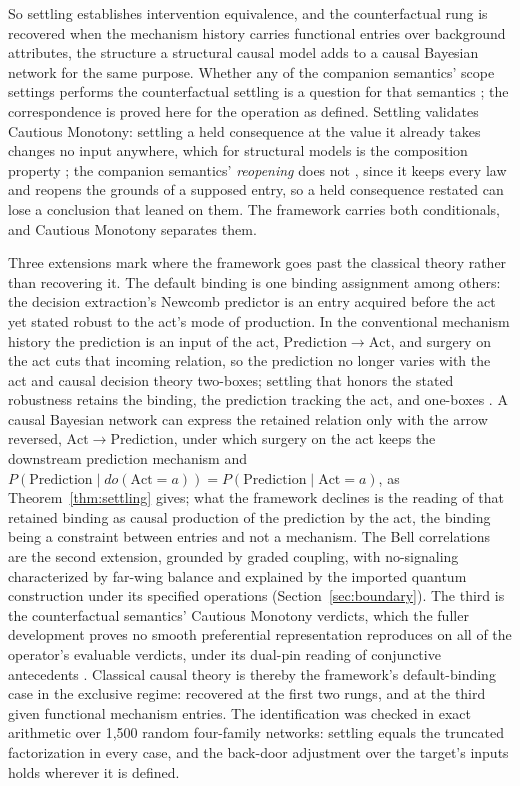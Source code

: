 \documentclass[11pt]{article}
\begin{document}
\noindent So settling establishes intervention equivalence, and the counterfactual rung is recovered when the mechanism history carries functional entries over background attributes, the structure a structural causal model adds to a causal Bayesian network for the same purpose. Whether any of the companion semantics' scope settings performs the counterfactual settling is a question for that semantics \cite{Aethus}; the correspondence is proved here for the operation as defined. Settling validates Cautious Monotony: settling a held consequence at the value it already takes changes no input anywhere, which for structural models is the composition property \cite{galles1998axiomatic}; the companion semantics' \emph{reopening} does not \cite{AethusSemantics}, since it keeps every law and reopens the grounds of a supposed entry, so a held consequence restated can lose a conclusion that leaned on them. The framework carries both conditionals, and Cautious Monotony separates them.

\noindent Three extensions mark where the framework goes past the classical theory rather than recovering it. The default binding is one binding assignment among others: the decision extraction's Newcomb predictor is an entry acquired before the act yet stated robust to the act's mode of production. In the conventional mechanism history the prediction is an input of the act, $\mathrm{Prediction} \to \mathrm{Act}$, and surgery on the act cuts that incoming relation, so the prediction no longer varies with the act and causal decision theory two-boxes; settling that honors the stated robustness retains the binding, the prediction tracking the act, and one-boxes \cite{AethusDecision}. A causal Bayesian network can express the retained relation only with the arrow reversed, $\mathrm{Act} \to \mathrm{Prediction}$, under which surgery on the act keeps the downstream prediction mechanism and $P(\mathrm{Prediction} \mid do(\mathrm{Act} = a)) = P(\mathrm{Prediction} \mid \mathrm{Act} = a)$, as Theorem~\ref{thm:settling} gives; what the framework declines is the reading of that retained binding as causal production of the prediction by the act, the binding being a constraint between entries and not a mechanism. The Bell correlations are the second extension, grounded by graded coupling, with no-signaling characterized by far-wing balance and explained by the imported quantum construction under its specified operations (Section~\ref{sec:boundary}). The third is the counterfactual semantics' Cautious Monotony verdicts, which the fuller development proves no smooth preferential representation reproduces on all of the operator's evaluable verdicts, under its dual-pin reading of conjunctive antecedents \cite{Aethus}. Classical causal theory is thereby the framework's default-binding case in the exclusive regime: recovered at the first two rungs, and at the third given functional mechanism entries. The identification was checked in exact arithmetic over 1{,}500 random four-family networks: settling equals the truncated factorization in every case, and the back-door adjustment over the target's inputs holds wherever it is defined.
\end{document}
